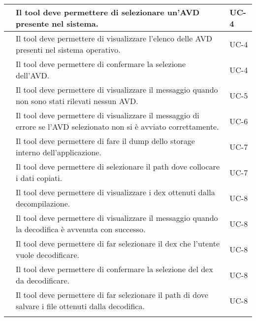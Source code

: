 \begin{longtable}{ | c| C{7cm} |C{3cm} |}
        & Il tool deve permettere di selezionare un'AVD presente nel sistema.                                                   & UC-4           \\\hline
        & Il tool deve permettere di visualizzare l'elenco delle AVD presenti nel sistema operativo.                            & UC-4           \\\hline
        & Il tool deve permettere di confermare la selezione dell'AVD.                                                          & UC-4           \\\hline
    \setcounter{subCount}{0}

           & Il tool deve permettere di visualizzare il messaggio quando non sono stati rilevati nessun AVD.                       & UC-5           \\\hline
           & Il tool deve permettere di visualizzare il messaggio di errore se l'AVD selezionato non si è avviato correttamente.   & UC-6           \\\hline
           & Il tool deve permettere di fare il dump dello storage interno dell'applicazione.                                      & UC-7           \\\hline
        & Il tool deve permettere di selezionare il path dove collocare i dati copiati.                                         & UC-7           \\\hline
    \setcounter{subCount}{0}

           & Il tool deve permettere di visualizzare i dex ottenuti dalla decompilazione.                                          & UC-8           \\\hline
        & Il tool deve permettere di visualizzare il messaggio quando la decodifica è avvenuta con successo.                    & UC-8           \\\hline
        & Il tool deve permettere di far selezionare il dex che l'utente vuole decodificare.                                    & UC-8           \\\hline
        & Il tool deve permettere di confermare la selezione del dex da decodificare.                                           & UC-8           \\\hline
        & Il tool deve permettere di far selezionare il path di dove salvare i file ottenuti dalla decodifica.                  & UC-8           \\\hline
    \setcounter{subCount}{0}


\end{longtable}
